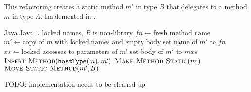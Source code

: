 \subsection{}
This refactoring creates a static method $m'$ in type $B$ that delegates to a method $m$ in type $A$. Implemented in .

\begin{algorithm}
\caption{$\refactoring{Introduce Indirection}(m : \type{Method}, B : \type{ClassOrInterface})$}
\begin{algorithmic}[1]
\REQUIRE Java
\ENSURE Java $\cup$ locked names, 
\medskip
\STATE \assert $B$ is non-library
\STATE $fn \leftarrow \text{fresh method name}$
\STATE $m' \leftarrow \text{copy of $m$ with locked names and empty body}$
\STATE set name of $m'$ to $fn$
\STATE $xs \leftarrow \text{locked accesses to parameters of $m'$}$
\STATE set body of $m'$ to \xspace$m$\code{(}$xs$\code{);}
\STATE $\textsc{Insert Method}(\text{\texttt{hostType}}(m), m')$
\STATE $\textsc{Make Method Static}(m')$
\STATE $\textsc{Move Static Method}(m', B)$
\end{algorithmic}
\end{algorithm}

TODO: implementation needs to be cleaned up
